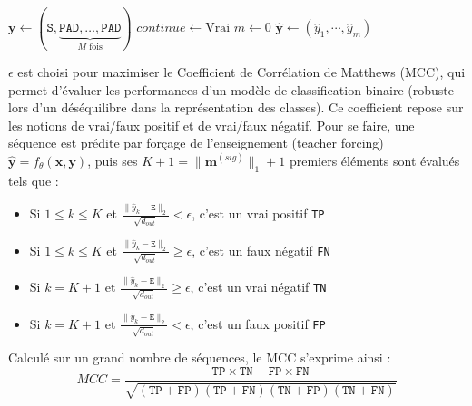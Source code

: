\begin{algorithm}[htbp]
\DontPrintSemicolon
\SetAlgoLined
{}
$\mathbf{y} \leftarrow (\texttt{S}, \underbrace{\texttt{PAD}, \dots, \texttt{PAD}}_{M \text{ fois}})$\;
$continue \leftarrow \text{Vrai}$\;
$m \leftarrow 0$\;
$\hat{\mathbf{y}} \leftarrow (\hat{y}_1, \cdots, \hat{y}_m)$
\caption{Inférence auto-régressive d'une séquence globale}
\label{algo:genglobal}
\end{algorithm}

$\epsilon$ est choisi pour maximiser le Coefficient de Corrélation de Matthews (MCC), qui permet d'évaluer les performances d'un modèle de classification binaire (robuste lors d'un déséquilibre dans la représentation des classes). Ce coefficient repose sur les notions de vrai/faux positif et de vrai/faux négatif. Pour se faire, une séquence est prédite par forçage de l'enseignement (teacher forcing) $\hat{\mathbf{y}} = f_{\theta}(\mathbf{x}, \mathbf{y})$, puis ses $K + 1 = \|\mathbf{m}^{(sig)}\|_1 + 1$ premiers éléments sont évalués tels que :
\begin{itemize}
\item Si $1 \leq k \leq K$ et $\frac{\|\hat{y}_{k} - \texttt{E}\|_2}{\sqrt{d_{out}}} < \epsilon$, c'est un vrai positif \texttt{TP}
\item Si $1 \leq k \leq K$ et $\frac{\|\hat{y}_{k} - \texttt{E}\|_2}{\sqrt{d_{out}}} \geq \epsilon$, c'est un faux négatif \texttt{FN}
\item Si $k = K+1$ et $\frac{\|\hat{y}_{k} - \texttt{E}\|_2}{\sqrt{d_{out}}} \geq \epsilon$, c'est un vrai négatif \texttt{TN}
\item Si $k = K+1$ et $\frac{\|\hat{y}_{k} - \texttt{E}\|_2}{\sqrt{d_{out}}} < \epsilon$, c'est un faux positif \texttt{FP}
\end{itemize}
Calculé sur un grand nombre de séquences, le MCC s'exprime ainsi :
\begin{equation}
\label{eq:MCCinf}
 MCC = \frac{\texttt{TP}\times \texttt{TN} - \texttt{FP} \times \texttt{FN}}{\sqrt{(\texttt{TP} + \texttt{FP})(\texttt{TP} + \texttt{FN})(\texttt{TN} + \texttt{FP})(\texttt{TN} + \texttt{FN})}}
\end{equation}

